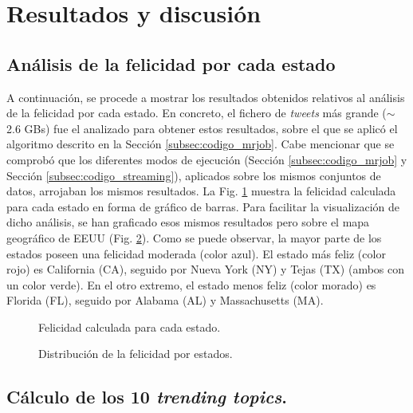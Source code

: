 \documentclass[10pt, spanish]{article}
\begin{document}
\section{Resultados y discusión}
\label{sec:resultados}

\subsection{Análisis de la felicidad por cada estado}
\label{subsec:felicidad}

A continuación, se procede a mostrar los resultados obtenidos relativos al análisis de la felicidad por cada estado. En concreto, el fichero de \textit{tweets} más grande ($\sim$ 2.6 GBs) fue el analizado para obtener estos resultados, sobre el que se aplicó el algoritmo descrito en la Sección \ref{subsec:codigo_mrjob}. Cabe mencionar que se comprobó que los diferentes modos de ejecución (Sección \ref{subsec:codigo_mrjob} y Sección \ref{subsec:codigo_streaming}), aplicados sobre los mismos conjuntos de datos, arrojaban los mismos resultados. La Fig. \ref{fig:BarHappinnes} muestra la felicidad calculada para cada estado en forma de gráfico de barras. Para facilitar la visualización de dicho análisis, se han graficado esos mismos resultados pero sobre el mapa geográfico de EEUU (Fig. \ref{fig:MapHappinnes}). Como se puede observar, la mayor parte de los estados poseen una felicidad moderada (color azul). El estado más feliz (color rojo) es California (CA), seguido por Nueva York (NY) y Tejas (TX) (ambos con un color verde). En el otro extremo, el estado menos feliz (color morado) es Florida (FL), seguido por Alabama (AL) y Massachusetts (MA).

\begin{figure}[H]
\begin{center}
\caption{\label{fig:BarHappinnes}Felicidad calculada para cada estado.}
\end{center}
\end{figure}


\begin{figure}[H]
\begin{center}
\caption{\label{fig:MapHappinnes}Distribución de la felicidad por estados.}
\end{center}
\end{figure}

\subsection{Cálculo de los 10 \textit{trending topics}.}
\label{subsec:trending_topics}
\end{document}
